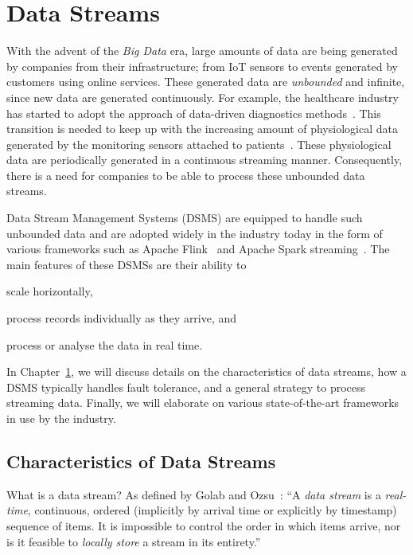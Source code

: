 \chapter{Data Streams} 
\label{chap:data_stream_processing}
With the advent of the \emph{Big Data} era, large amounts of data are being generated 
by companies from their infrastructure; from IoT sensors to events 
generated by customers using online services.
These generated data 
are \emph{unbounded} and infinite, since 
new data are generated continuously. 
For example, the healthcare industry has started to 
adopt the approach of data-driven diagnostics methods~\cite{hospital_diagnosis}. 
This transition is needed to keep up with the increasing amount 
of physiological data generated by the monitoring sensors attached to
patients~\cite{hospital_data_monitoring}. These physiological data are periodically
generated in a continuous streaming manner. 
Consequently, there is a need for 
companies to be able to process these unbounded data streams.

Data Stream Management Systems (DSMS)
are equipped to handle such unbounded data and are adopted 
widely in the industry today in the form of various frameworks such as Apache Flink~\cite{flink} and 
Apache Spark streaming~\cite{spark_streaming}.
The main features of these DSMSs are their ability to 
\renewcommand{\labelenumi}{(\roman{enumi})}
\begin{enumerate*}
    \item scale horizontally, 
    \item process records individually as they arrive, and
    \item process or analyse the data in real time.
\end{enumerate*}

In Chapter~\ref{chap:data_stream_processing}, we will discuss details on  
the characteristics of data streams, how a DSMS typically handles fault tolerance, and
a general strategy to process streaming data. Finally, we will elaborate on
various state-of-the-art frameworks in use by the industry.

\section{Characteristics of Data Streams}
\label{sec:characteristics_data_stream}
What is a data stream? As defined by Golab and Ozsu~\cite{golab_data_stream}:
“A \emph{data stream} is a \emph{real-time}, continuous, ordered (implicitly by arrival time 
or explicitly by timestamp) sequence of items. It is impossible to control the order
in which items arrive, nor is it feasible to \emph{locally store} a stream in its entirety.”

